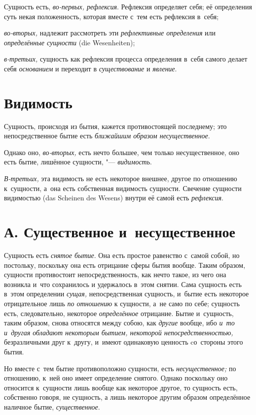 Сущность есть, {\em во-первых, рефлексия}. Рефлексия определяет себя;
её определения суть некая положенность, которая вместе с~тем есть
рефлексия в~себя;

{\em во-вторых,} надлежит рассмотреть эти {\em рефлективные определения} или
{\em определённые сущности} (die Wesenheiten);

{\em в-третьих,} сущность как рефлексия процесса
определения в~себя самого делает себя {\em основанием}
и переходит в {\em существование} и {\em явление}.

\section{Видимость}

Сущность, происходя из бытия, кажется
противостоящей последнему; это непосредственное бытие есть
{\em ближайшим образом несущественное}.

Однако оно, {\em во-вторых,} есть нечто большее, чем только
несущественное, оно есть бытие, лишённое сущности, "--- {\em видимость}.

{\em В-третьих,} эта видимость не есть некоторое
внешнее, другое по отношению к~сущности, а~она есть собственная видимость
сущности. Свечение сущности видимостью (das Scheinen des Wesens) внутри её
самой есть {\em рефлексия}.

\section[А. Существенное и~несущественное]{А. Существенное и~несущественное}

Сущность есть {\em снятое бытие}.
Она есть простое равенство с~самой собой, но постольку, поскольку
она есть отрицание сферы бытия вообще. Таким образом, сущности противостоит
непосредственность, как нечто такое, из чего она возникла и~что сохранилось
и удержалось в~этом снятии. Сама сущность есть в~этом определении
{\em сущая,} непосредственная сущность, и~бытие есть
некоторое отрицательное лишь {\em по отношению} к
сущности, а~не само по себе; сущность есть, следовательно, некоторое
{\em определённое} отрицание. Бытие и~сущность, таким
образом, снова относятся между собою, как {\em другие} вообще, ибо
{\em и~то и~другая обладают некоторым бытием, некоторой непосредственностью,}
безразличными друг к~другу, и~имеют одинаковую ценность cо~стороны этого бытия.

Но вместе с~тем бытие противоположно сущности, есть
{\em несущественное;} по отношению, к~ней оно имеет
определение снятого. Однако поскольку оно относится к~сущности лишь вообще
как некоторое другое, то сущность есть, собственно говоря, не сущность, а
лишь некоторое другим образом определённое наличное бытие,
{\em существенное}.

